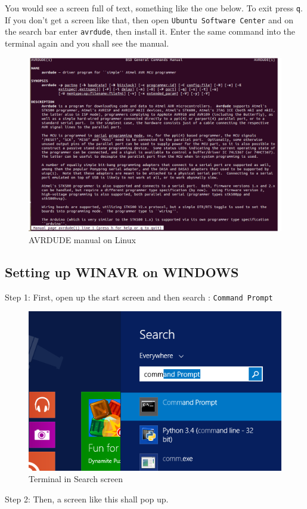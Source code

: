 \documentclass[12pt]{article}
\begin{document}
You would see a screen full of text, something like the one below. To exit press \texttt{q}. If you don't get a screen like that, then open \texttt{Ubuntu Software Center} and on the search bar enter \texttt{avrdude}, then install it. Enter the same command into the terminal again and you shall see the manual.

\vspace{12pt}

\begin{figure}[h!]
\centering
\includegraphics[scale=0.45]{manavrdude.png}
\caption{AVRDUDE manual on Linux}
\end{figure}


\clearpage

{\large \subsection{Setting up WINAVR on WINDOWS}}
Step 1: First, open up the start screen and then search : \texttt{Command Prompt}
\begin{figure}[h!]
\centering
\includegraphics[scale=0.45]{Figcmd.png}
\caption{Terminal in Search screen}
\end{figure}
\linebreak
Step 2: Then, a screen like this shall pop up.
\end{document}
